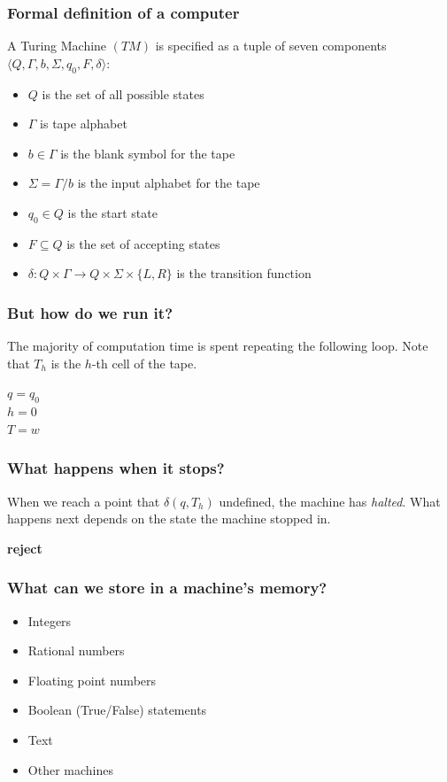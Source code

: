 \documentclass[aspectratio=169]{beamer}
\begin{document}
\begin{frame}
\frametitle{Formal definition of a computer}
A Turing Machine $(TM)$ is specified as a tuple of seven components $\langle Q, \Gamma, b, \Sigma, q_0, F, \delta \rangle$:

\begin{itemize}
	\item $Q$ is the set of all possible states
	\item $\Gamma$ is tape alphabet
	\item $b \in \Gamma$ is the blank symbol for the tape
	\item $\Sigma = \Gamma/b$ is the input alphabet for the tape
	\item $q_0 \in Q$ is the start state
	\item $F \subseteq Q$ is the set of accepting states
	\item $\delta: Q \times \Gamma \to Q \times \Sigma \times \{L, R\}$ is the transition function
\end{itemize}
\end{frame}

\begin{frame}
\frametitle{But how do we run it?}
The majority of computation time is spent repeating the following loop. Note that $T_h$ is the $h$-th cell of the tape.
\begin{algorithm}[H]
$q = q_0$\\
$h = 0$\\
$T = w$ 
\end{algorithm}
\end{frame}

\begin{frame}
\frametitle{What happens when it stops?}
When we reach a point that $\delta(q, T_h)$ undefined, the machine has {\em halted}. What happens next depends on the state the machine stopped in.
\begin{algorithm}[H]
{\bf{reject}}
\end{algorithm}
\end{frame}

\begin{frame}
\frametitle{What can we store in a machine's memory?}
\begin{itemize}
	\item<1-> Integers
	\item<2-> Rational numbers
	\item<3-> Floating point numbers
	\item<4-> Boolean (True/False) statements
	\item<5-> Text
	\item<6-> Other machines
\end{itemize}
\end{frame}
\end{document}
